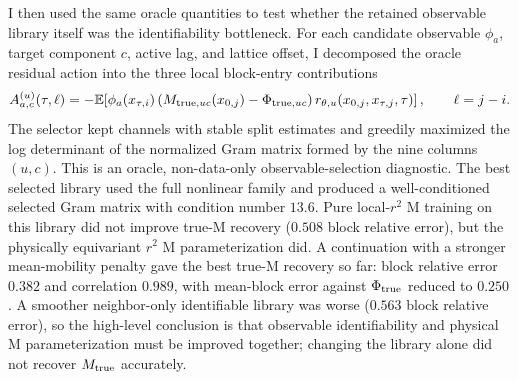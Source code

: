 \documentclass[11pt]{article}
\newcommand{\E}{\mathbb{E}}
\begin{document}
I then used the same oracle quantities to test whether the retained observable
library itself was the identifiability bottleneck.  For each candidate
observable \(\phi_a\), target component \(c\), active lag, and lattice offset, I
decomposed the oracle residual action into the three local block-entry
contributions
\[
  A_{a,c}^{(u)}(\tau,\ell)
  =
  -\E\!\left[
    \phi_a(x_{\tau,i})
    \left(M_{{\rm true},u c}(x_{0,j})-\Phi_{{\rm true},u c}\right)
    r_{\theta,u}(x_{0,j},x_{\tau,j},\tau)
  \right],
  \qquad \ell=j-i .
\]
The selector kept channels with stable split estimates and greedily maximized
the log determinant of the normalized Gram matrix formed by the nine columns
\((u,c)\).  This is an oracle, non-data-only observable-selection diagnostic.
The best selected library used the full nonlinear family and produced a
well-conditioned selected Gram matrix with condition number \(13.6\).  Pure
local-\(r^2\) M training on this library did not improve true-M recovery
(\(0.508\) block relative error), but the physically equivariant \(r^2\) M
parameterization did.  A continuation with a stronger mean-mobility penalty
gave the best true-M recovery so far: block relative error \(0.382\) and
correlation \(0.989\), with mean-block error against \(\Phi_{\rm true}\)
reduced to \(0.250\).  A smoother neighbor-only identifiable library was worse
(\(0.563\) block relative error), so the high-level conclusion is that
observable identifiability and physical M parameterization must be improved
together; changing the library alone did not recover \(M_{\rm true}\) accurately.
\end{document}
